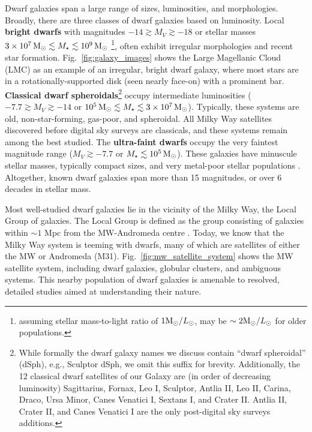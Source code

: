 Dwarf galaxies span a large range of sizes, luminosities, and
morphologies. Broadly, there are three classes of dwarf galaxies based
on luminosity. Local \textbf{bright dwarfs} with magnitudes
\(-14 \gtrsim M_V \gtrsim  -18\) or stellar masses
\(3\times10^7\,{\rm M}_{\odot} \lesssim M_\star \lesssim 10^9\,{\rm M}_{\odot}\) \footnote{assuming
  stellar mass-to-light ratio of \(1 {\rm M}_{\odot} / L_{\odot}\), may be
  \(\sim 2 {\rm M}_{\odot}/L_\odot\) for older populations.}, often exhibit
irregular morphologies and recent star formation.
Fig.~\ref{fig:galaxy_images} shows the Large Magellanic Cloud (LMC) as
an example of an irregular, bright dwarf galaxy, where most stars are in
a rotationally-supported disk (seen nearly face-on) with a prominent
bar. \textbf{Classical dwarf spheroidals}\footnote{While formally the
  dwarf galaxy names we discuss contain ``dwarf spheroidal'' (dSph),
  e.g., Sculptor dSph, we omit this suffix for brevity. Additionally,
  the 12 classical dwarf satellites of our Galaxy are (in order of
  decreasing luminosity) Sagittarius, Fornax, Leo I, Sculptor, Antlia
  II, Leo II, Carina, Draco, Ursa Minor, Canes Venatici I, Sextans I,
  and Crater II. Antlia II, Crater II, and Canes Venatici I are the only
  post-digital sky surveys additions.} occupy intermediate luminosities
( \(-7.7 \gtrsim M_V  \gtrsim -14\) or
\(10^5\,{\rm M}_{\odot} \lesssim M_\star \lesssim 3\times10^7\,{\rm M}_{\odot}\)). Typically,
these systems are old, non-star-forming, gas-poor, and spheroidal. All
Milky Way satellites discovered before digital sky surveys are
classicals, and these systems remain among the best studied. The
\textbf{ultra-faint dwarfs} occupy the very faintest magnitude range
(\(M_V \gtrsim -7.7\) or \(M_\star \lesssim 10^5\,{\rm M}_{\odot}\)). These galaxies
have minuscule stellar masses, typically compact sizes, and very
metal-poor stellar populations \citep[see the review by][]{simon2019}.
Altogether, known dwarf galaxies span more than 15 magnitudes, or over 6
decades in stellar mass.

Most well-studied dwarf galaxies lie in the vicinity of the Milky Way,
the Local Group of galaxies. The Local Group is defined as the group
consisting of galaxies within \(\sim 1\) Mpc from the MW-Andromeda
centre \citep[e.g.,][ and references therein]{mcconnachie2012}. Today,
we know that the Milky Way system is teeming with dwarfs, many of which
are satellites of either the MW or Andromeda (M31).
Fig.~\ref{fig:mw_satellite_system} shows the MW satellite system,
including dwarf galaxies, globular clusters, and ambiguous systems. This
nearby population of dwarf galaxies is amenable to resolved, detailed
studies aimed at understanding their nature.

